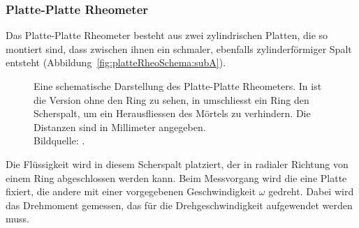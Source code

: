 \subsubsection{Platte-Platte Rheometer}
\label{Kapitel:Parameter:PlattePlatteRheo}
Das Platte-Platte Rheometer besteht aus zwei zylindrischen Platten, die so montiert sind, dass zwischen ihnen ein schmaler, ebenfalls zylinderförmiger Spalt entsteht (Abbildung~\ref{fig:platteRheoSchema:subA}).
\begin{figure}[tb]
    \centering
    \caption{Eine schematische Darstellung des Platte-Platte Rheometers. In  ist die Version ohne den Ring zu sehen, in  umschliesst ein Ring den Scherspalt, um ein Herausfliessen des Mörtels zu verhindern. Die Distanzen sind in Millimeter angegeben.\\
    Bildquelle: \cite{Marco}.}
    \label{fig:kapRheo}
\end{figure}
Die Flüssigkeit wird in diesem Scherspalt platziert, der in radialer Richtung von einem Ring abgeschlossen werden kann. Beim Messvorgang wird die eine Platte fixiert, die andere mit einer vorgegebenen Geschwindigkeit $\omega$ gedreht.
Dabei wird das Drehmoment gemessen, das für die Drehgeschwindigkeit aufgewendet werden muss.

